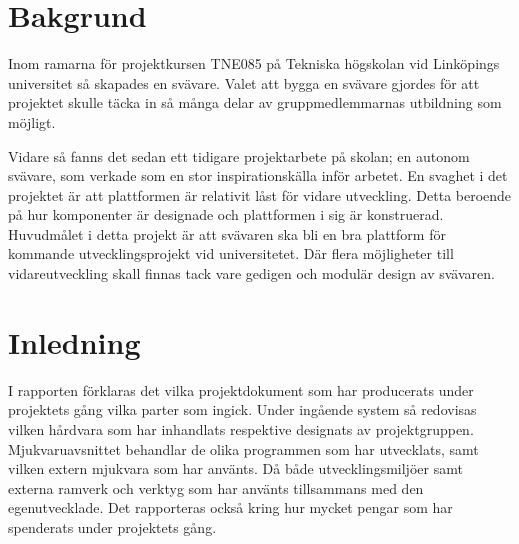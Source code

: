 \section{Bakgrund}
Inom ramarna för projektkursen TNE085 på Tekniska högskolan vid Linköpings
universitet så skapades en svävare. Valet att bygga en svävare gjordes för att
projektet skulle täcka in så många delar av gruppmedlemmarnas utbildning som
möjligt.

Vidare så fanns det sedan ett tidigare projektarbete på skolan; en autonom
svävare, som verkade som en stor inspirationskälla inför arbetet. En svaghet i
det projektet är att plattformen är relativit låst för vidare utveckling. Detta beroende på
hur komponenter är designade och plattformen i sig är konstruerad. Huvudmålet
i detta projekt är att svävaren ska bli en bra plattform för kommande
utvecklingsprojekt vid universitetet. Där flera möjligheter till
vidareutveckling skall finnas tack vare gedigen och modulär design av svävaren.

\section{Inledning}
I rapporten förklaras det vilka projektdokument som har producerats under
projektets gång vilka parter som ingick. Under ingående system så redovisas
vilken hårdvara som har inhandlats respektive designats av projektgruppen.
Mjukvaruavsnittet behandlar de olika programmen som har utvecklats, samt vilken
extern mjukvara som har använts. Då både utvecklingsmiljöer samt externa
ramverk och verktyg som har använts tillsammans med den egenutvecklade. Det
rapporteras också kring hur mycket pengar som har spenderats under projektets
gång.
